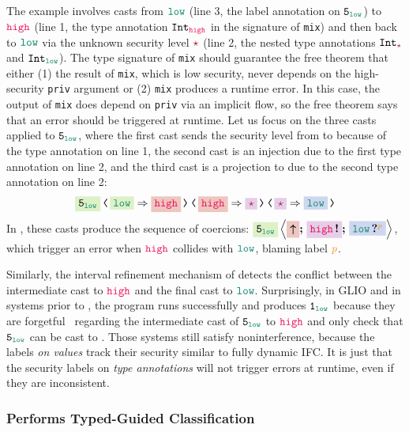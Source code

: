 \noindent The example involves casts from $\low$ (line 3, the label annotation
on $\key{5}_{\low}$) to $\high$ (line 1, the type annotation $\Int_{\high}$ in
the signature of \texttt{mix}) and then back to $\low$ via the unknown security
level $\unk$ (line 2, the nested type annotations $\Int_{\unk}$ and
$\Int_{\low}$). The type signature of \texttt{mix} should guarantee the free
theorem that either (1) the result of \texttt{mix}, which is low security, never
depends on the high-security \texttt{priv} argument or (2) \texttt{mix} produces
a runtime error. In this case, the output of \texttt{mix} does depend on
\texttt{priv} via an implicit flow, so the free theorem says that an error
should be triggered at runtime. Let us focus on the three casts applied to
$\key{5}_{\low}$, where the first cast sends the security level from \low to
\high because of the type annotation on line 1, the second cast is an injection
due to the first type annotation on line 2, and the third cast is a projection
to \low due to the second type annotation on line 2:
\[
\cccast{
  \cccast{
    \cccast{\colorbox{White!70!YellowGreen}{$\key{5}_{\low}$}}{\colorbox{White!70!YellowGreen}{\low} \Rightarrow \colorbox{White!80!Maroon}{\high}}
  }{\colorbox{White!80!Maroon}{\high} \Rightarrow \colorbox{White!80!Purple}{\unk}}}
  {\colorbox{White!80!Purple}{\unk} \Rightarrow \colorbox{White!80!NavyBlue}{\low}}
\]
In \Surface, these casts produce the sequence of coercions:
$\colorbox{White!70!YellowGreen}{$\key{5}_{\low}$} \left\langle
\colorbox{White!80!Maroon}{\up} \seq \colorbox{White!80!Purple}{\inj{\high}}
\seq \colorbox{White!80!NavyBlue}{\proj{\low}{p}} \right\rangle$, which trigger
an error when $\high$ collides with $\low$, blaming label $\bl{p}$.

Similarly, the interval refinement mechanism of \GSLRef detects the conflict
between the intermediate cast to $\high$ and the final cast to $\low$.
Surprisingly, in GLIO and in systems prior to \GSLRef \parencite{Disney:2011fv,
  Fennell:2013ab}, the program runs successfully and produces $\key{1}_{\low}$
because they are forgetful~\parencite{Greenberg:2014aa} regarding the
intermediate cast of $\key{5}_{\low}$ to $\high$ and only check that
$\key{5}_{\low}$ can be cast to \low. Those systems still satisfy
noninterference, because the labels \textit{on values} track their security
similar to fully dynamic IFC. It is just that the security labels on
\textit{type annotations} will not trigger errors at runtime, even if they are
inconsistent.

\subsubsection{\Surface Performs Typed-Guided Classification}


